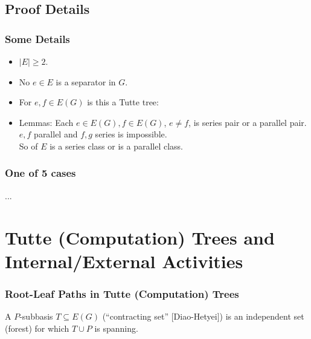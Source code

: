 \documentclass{beamer}
\begin{document}
\subsection{Proof Details}
\begin{frame}
\frametitle{Some Details}
\begin{itemize}
\item $|E|\geq 2$.
\item
No $e\in E$ is a separator in $G$.
\item
For  $e,f\in E(G)$ is this a Tutte tree:

\item
Lemmas: Each $e\in E(G),f\in E(G)$, $e\neq f$, 
is series pair or a parallel pair.\\
$e,f$ parallel and $f,g$ series is impossible.\\
So  of $E$ is a series class or is a parallel class.
\end{itemize}
\end{frame}

\begin{frame}
\frametitle{One of 5 cases}
\begin{center}...\end{center}
\end{frame}




\section{Tutte (Computation) Trees and Internal/External Activities}

\begin{frame}
\frametitle{Root-Leaf Paths in Tutte (Computation) Trees}
A {$P$-subbasis $T\subseteq E(G)$ 
(``contracting set'' [Diao-Hetyei])}
is an independent set (forest) for which 
$T\cup P$ is spanning.



\vfill
{}

\end{frame}
\end{document}
